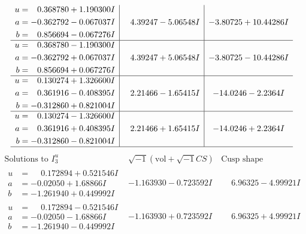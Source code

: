\documentclass[1p]{elsarticle_modified}
\theoremstyle{definition}
\newcommand{\I}{\sqrt{-1}}
\begin{document}
$$\begin{array}{c|c|c}
\begin{aligned}
u &= \phantom{-}0.368780 + 1.190300 I \\
a &= -0.362792 - 0.067037 I \\
b &= \phantom{-}0.856694 - 0.067276 I\end{aligned}
 & \phantom{-}4.39247 - 5.06548 I & -3.80725 + 10.44286 I \\ \hline\begin{aligned}
u &= \phantom{-}0.368780 - 1.190300 I \\
a &= -0.362792 + 0.067037 I \\
b &= \phantom{-}0.856694 + 0.067276 I\end{aligned}
 & \phantom{-}4.39247 + 5.06548 I & -3.80725 - 10.44286 I \\ \hline\begin{aligned}
u &= \phantom{-}0.130274 + 1.326600 I \\
a &= \phantom{-}0.361916 - 0.408395 I \\
b &= -0.312860 + 0.821004 I\end{aligned}
 & \phantom{-}2.21466 - 1.65415 I & -14.0246 - 2.2364 I \\ \hline\begin{aligned}
u &= \phantom{-}0.130274 - 1.326600 I \\
a &= \phantom{-}0.361916 + 0.408395 I \\
b &= -0.312860 - 0.821004 I\end{aligned}
 & \phantom{-}2.21466 + 1.65415 I & -14.0246 + 2.2364 I\\
 \hline 
 \end{array}$$\newpage$$\begin{array}{c|c|c}  
\text{Solutions to }I^u_{3}& \I (\text{vol} + \sqrt{-1}CS) & \text{Cusp shape}\\
 \hline 
\begin{aligned}
u &= \phantom{-}0.172894 + 0.521546 I \\
a &= -0.02050 + 1.68866 I \\
b &= -1.261940 + 0.449992 I\end{aligned}
 & -1.163930 - 0.723592 I & \phantom{-}6.96325 - 4.99921 I \\ \hline\begin{aligned}
u &= \phantom{-}0.172894 - 0.521546 I \\
a &= -0.02050 - 1.68866 I \\
b &= -1.261940 - 0.449992 I\end{aligned}
 & -1.163930 + 0.723592 I & \phantom{-}6.96325 + 4.99921 I \\ \hline\begin{aligned}

\end{aligned}
\end{array}$$
\end{document}
